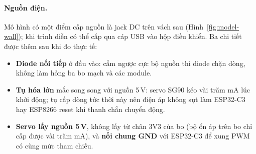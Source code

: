 \paragraph{Nguồn điện.} Mô hình có một điểm cấp nguồn là jack DC trên vách sau
(Hình~\ref{fig:model-wall}); khi trình diễn có thể cấp qua cáp USB vào hộp điều
khiển. Ba chi tiết được thêm sau khi đo thực tế:
\begin{itemize}[nosep]
  \item \textbf{Diode nối tiếp} ở đầu vào: cắm ngược cực bộ nguồn thì diode chặn dòng, không
        làm hỏng ba bo mạch và các module.
  \item \textbf{Tụ hóa lớn} mắc song song với nguồn 5\,V: servo SG90 kéo vài trăm mA lúc khởi
        động; tụ cấp dòng tức thời này nên điện áp không sụt làm ESP32-C3 hay ESP8266
        reset khi thanh chắn chuyển động.
  \item \textbf{Servo lấy nguồn 5\,V}, không lấy từ chân 3V3 của bo (bộ ổn áp trên bo
        chỉ cấp được vài trăm mA), và \textbf{nối chung GND} với ESP32-C3 để xung PWM có cùng
        mức tham chiếu.
\end{itemize}

